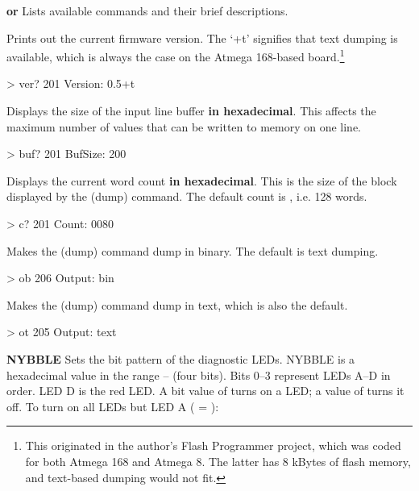 \begin{description}
\item{\bfseries{} or } Lists available commands and their
  brief descriptions.

\item{\bfseries{}} Prints out the current firmware version. The ‘+t’
  signifies that text dumping is available, which is always the case
  on the Atmega 168-based board.\footnote{This originated in the
    author's Flash Programmer project, which was coded for both
    Atmega 168 and Atmega 8. The latter has 8 kBytes of flash
    memory, and text-based dumping would not fit.}

\begin{debcode}
[running]> ver?
201 Version: 0.5+t
\end{debcode}

\item{\bfseries{}} Displays the size of the input line buffer {\bfseries
  in hexadecimal}. This affects the maximum number of values that can
  be written to memory on one line.

\begin{debcode}
[running]> buf?
201 BufSize: 200
\end{debcode}

\item{\bfseries{}} Displays the current word count {\bfseries in
  hexadecimal}. This is the size of the block displayed by the 
  (dump) command. The default count is , i.e. 128 words.

\begin{debcode}
[running]> c?
201 Count: 0080
\end{debcode}

\item{\bfseries{}} Makes the 
  (dump) command dump in binary. The default is text dumping.

\begin{debcode}
[running]> ob
206 Output: bin
\end{debcode}

\item{\bfseries{}} Makes the 
  (dump) command dump in text, which is also the default.

\begin{debcode}
[running]> ot
205 Output: text
\end{debcode}

\item{\bfseries{} NYBBLE} Sets the bit pattern of the diagnostic
  LEDs. \gls{NYBBLE} is a hexadecimal value in the range
  – (four bits). Bits 0–3 represent LEDs A–D in order. LED D is the
  red LED. A bit value of  turns on a LED; a value of 
  turns it off. To turn on all LEDs but LED A ( = ):


\end{description}
